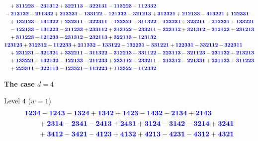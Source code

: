 \documentclass{scrartcl}
\theoremstyle{plain}
\theoremstyle{definition}
\newcommand{\1}[1]{1_{\{#1\}}}
\newcommand{\ds}{d} %
\def\word#1{{\color{blue}\mathbf{#1}}}
\begin{document}
\begin{scriptsize}
\begin{align*}
  &\quad + \word{311223} - \word{231312} + \word{322113} - \word{322131} - \word{113223} - \word{112332} \\
  & - \word{213132} + \word{211332} + \word{213231} - \word{133122} - \word{121332} - \word{321213} + \word{312321} + \word{212133} - \word{313221} + \word{122331}\\
  &\quad + \word{132123} + \word{131322} + \word{232311} - \word{322311} - \word{132321} - \word{311322} - \word{123231} + \word{323211} - \word{212331} + \word{133221}\\
  &\quad - \word{122133} - \word{131223} - \word{211233} + \word{233112} + \word{313122} - \word{233211} - \word{323112} + \word{321312} - \word{312123} + \word{231213}\\
  &\quad + \word{311223} + \word{121233} - \word{231312} - \word{232113} + \word{322113} + \word{123132} \\
  & \word{123123} + \word{312312} + \word{112233} + \word{211332} - \word{133122} - \word{132231} - \word{331221} + \word{122331} - \word{332112} - \word{322311}\\
  &\quad + \word{231231} + \word{321321} + \word{332211} - \word{311322} - \word{312213} + \word{331122} - \word{223113} - \word{321123} - \word{231132} + \word{213213}\\
  &\quad + \word{133221} + \word{132132} - \word{122133} - \word{211233} + \word{233112} - \word{233211} - \word{213312} - \word{221331} + \word{221133} + \word{311223}\\
  &\quad + \word{223311} + \word{322113} - \word{123321} - \word{113223} + \word{113322} - \word{112332}
\end{align*}
\end{scriptsize}
\textbf{The case $\ds=4$}

Level $4$ ($w=1$)
\begin{align*}
  &\word{1234} - \word{1243} - \word{1324} + \word{1342} + \word{1423} - \word{1432} - \word{2134} + \word{2143}\\&\qquad + \word{2314} - \word{2341} - \word{2413} + \word{2431} + \word{3124}  
   - \word{3142} - \word{3214} + \word{3241} \\&\qquad+ \word{3412} - \word{3421} - \word{4123} + \word{4132} + \word{4213} - \word{4231} - \word{4312} + \word{4321}
\end{align*}

\end{document}
